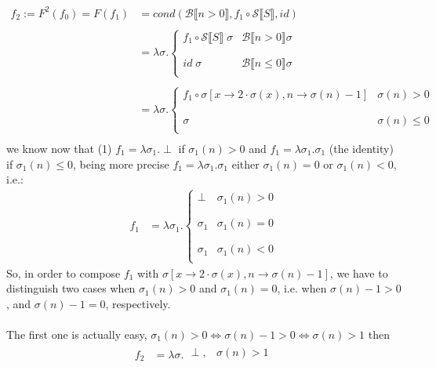 \documentclass{article}
\newcommand{\bcal}{\mathcal{B}}
\newcommand{\scal}{\mathcal{S}}
\newcommand{\bool}[1]{\bcal \llbracket #1 \rrbracket}
\newcommand{\sem}[1]{\scal \llbracket #1 \rrbracket}
\begin{document}
\begin{align*}
f_2 := F^2(f_0) =  F(f_1) &= cond(\bool{n > 0}, f_1 \circ \sem{S},id) \\ \\
& = \lambda \sigma . \left\{
\begin{array}{ll}
      f_1 \circ \sem{S} \; \sigma & \bool{n>0} \sigma\\
      \\ \\
      id \; \sigma & \bool{n \leq 0} \sigma \\
\end{array} 
\right. \\ \\
& = \lambda \sigma . \left\{
\begin{array}{ll}
      f_1 \circ \sigma[x\rightarrow 2 \cdot \sigma(x), n \rightarrow \sigma(n)-1] & \sigma(n) > 0 \\
      \\ \\
      \sigma & \sigma(n) \leq 0 \\
\end{array} 
\right.\\
\end{align*}
we know now that (1) $f_1 = \lambda \sigma_1 . \perp$ if $\sigma_1(n) > 0$ and $f_1 = \lambda \sigma_1 . \sigma_1$ (the identity) if $\sigma_1(n) \leq 0$, being more precise $f_1 = \lambda \sigma_1 . \sigma_1$ either $\sigma_1(n) = 0$ or $\sigma_1(n) < 0$, i.e.:\\
\begin{align*}
f_1 &= \lambda \sigma_1 . \left\{
\begin{array}{ll}
      \perp & \sigma_1(n) > 0 \\
      \\ \\
      \sigma_1 & \sigma_1(n) = 0 \\
      \\ \\
      \sigma_1 & \sigma_1(n) < 0 \\
\end{array} 
\right.
\end{align*}
So, in order to compose $f_1$ with $\sigma[x\rightarrow 2 \cdot \sigma(x), n \rightarrow \sigma(n)-1]$, we have to distinguish two cases when $\sigma_1(n) > 0$ and $\sigma_1(n) = 0$, i.e. when $\sigma(n)-1 > 0$, and $\sigma(n)-1 = 0$, respectively.\\ \\
The first one is actually easy, $\sigma_1(n) > 0 \iff \sigma(n)-1 > 0 \iff \sigma(n) > 1$ then\begin{align*}
f_2  &= \lambda \sigma . \left.
\begin{array}{ll}
      \perp, & \sigma(n) > 1 \\
\end{array} 
\right.
\end{align*}
\end{document}
